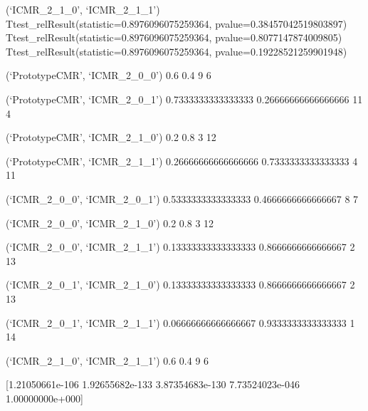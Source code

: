 \documentclass[
  letterpaper,
  DIV=11,
  numbers=noendperiod]{scrreport}
\begin{document}
(`ICMR\_2\_1\_0', `ICMR\_2\_1\_1')
Ttest\_relResult(statistic=0.8976096075259364,
pvalue=0.38457042519803897)
Ttest\_relResult(statistic=0.8976096075259364,
pvalue=0.8077147874009805)
Ttest\_relResult(statistic=0.8976096075259364,
pvalue=0.19228521259901948)

(`PrototypeCMR', `ICMR\_2\_0\_0') 0.6 0.4 9 6

(`PrototypeCMR', `ICMR\_2\_0\_1') 0.7333333333333333 0.26666666666666666
11 4

(`PrototypeCMR', `ICMR\_2\_1\_0') 0.2 0.8 3 12

(`PrototypeCMR', `ICMR\_2\_1\_1') 0.26666666666666666 0.7333333333333333
4 11

(`ICMR\_2\_0\_0', `ICMR\_2\_0\_1') 0.5333333333333333 0.4666666666666667
8 7

(`ICMR\_2\_0\_0', `ICMR\_2\_1\_0') 0.2 0.8 3 12

(`ICMR\_2\_0\_0', `ICMR\_2\_1\_1') 0.13333333333333333
0.8666666666666667 2 13

(`ICMR\_2\_0\_1', `ICMR\_2\_1\_0') 0.13333333333333333
0.8666666666666667 2 13

(`ICMR\_2\_0\_1', `ICMR\_2\_1\_1') 0.06666666666666667
0.9333333333333333 1 14

(`ICMR\_2\_1\_0', `ICMR\_2\_1\_1') 0.6 0.4 9 6

{[}1.21050661e-106 1.92655682e-133 3.87354683e-130 7.73524023e-046
1.00000000e+000{]}
\end{document}
